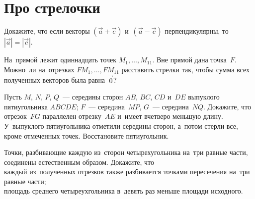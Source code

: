 
\section*{Про стрелочки}


\begin{problems}
\let\ov\overrightarrow

\item
Докажите, что если векторы $(\ov{a} + \ov{c})$ и~$(\ov{a} - \ov{c})$
перпендикулярны, то~$|\ov{a}| = |\ov{c}|$.

\item
На~прямой лежит одиннадцать точек $M_{1}, \ldots, M_{11}$.
Вне прямой дана точка~$F$.
Можно~ли на~отрезках $F M_{1}, \ldots, FM_{11}$ расставить стрелки
так, чтобы сумма всех полученных векторов была равна~$\ov{0}$?

\item
\subproblem
Пусть $M$, $N$, $P$, $Q$~--- середины сторон $AB$, $BC$, $CD$ и~$DE$
выпуклого пятиугольника $ABCDE$;
$F$~--- середина~$MP$, $G$~--- середина~$NQ$.
Докажите, что отрезок~$FG$ параллелен отрезку~$AE$ и~имеет вчетверо меньшую
длину.
\\
\subproblem
У~выпуклого пятиугольника отметили середины сторон, а~потом стерли все, кроме
отмеченных точек.
Восстановите пятиугольник.

\end{problems}

\begingroup
\ifx\problemfigurewidth\undefined
\newlength\problemfigurewidth
\newlength\problemtextwidth
\newlength\problemspacewidth
\fi
\setlength\problemfigurewidth{2cm}
\setlength\problemspacewidth{1em}
\setlength\problemtextwidth{\linewidth}
\addtolength\problemtextwidth{-\problemfigurewidth}
\addtolength\problemtextwidth{-\problemspacewidth}
\begin{minipage}{\problemtextwidth}
\begin{problems}
\item
Точки, разбивающие каждую из~сторон четырехугольника на~три равные части,
соединены естественным образом.
Докажите, что
\\
\subproblem
каждый из~полученных отрезков также разбивается точками пересечения на~три
равные части;
\\
\subproblem
площадь среднего четыреухгольника в~девять раз меньше площади исходного.
\end{problems}
\end{minipage}\hspace{\problemspacewidth}%
\begin{minipage}{\problemfigurewidth}
\end{minipage}
\endgroup

